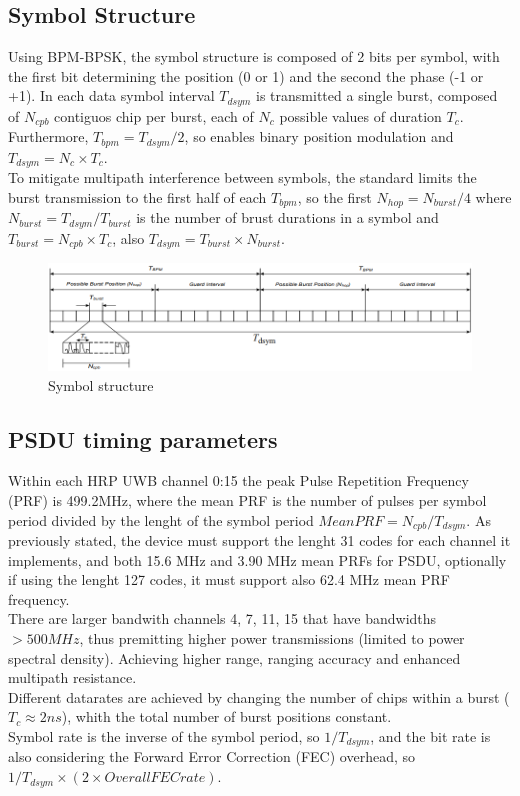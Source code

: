 \documentclass[conference]{IEEEtran}
\begin{document}
\subsection{Symbol Structure}
Using BPM-BPSK, the symbol structure is composed of 2 bits per symbol, with the first bit
determining the position (0 or 1) and the second the phase (-1 or +1). In each data symbol
interval $T_{dsym}$ is transmitted a single burst, composed of $N_{cpb}$ contiguos chip per 
burst, each of $N_{c}$ possible values of duration $T_{c}$. Furthermore, $T_{bpm}=T_{dsym}/2$, 
so enables binary position modulation and $T_{dsym}=N_{c} \times T_{c}$.\\
To mitigate multipath interference between symbols, the standard\cite{10794632} limits the burst transmission 
to the first half of each $T_{bpm}$, so the first $N_{hop}=N_{burst}/4$ where 
$N_{burst}=T_{dsym}/T_{burst}$ is the number of brust durations in a symbol and 
$T_{burst}=N_{cpb} \times T_{c}$, also $T_{dsym}=T_{burst} \times N_{burst}$.\\

\begin{figure}[!h]
  \centering
  \includegraphics[width=\linewidth]{symbol-structure}
  \caption{Symbol structure}
  \label{fig:symbol-structure}
\end{figure}

\subsection{PSDU timing parameters}
Within each HRP UWB channel {0:15} the peak Pulse Repetition Frequency (PRF) is 499.2MHz,
where the mean PRF is the number of pulses per symbol period divided by the lenght of the
symbol period $Mean PRF = N_{cpb}/T_{dsym}$.
As previously stated, the device must support the lenght 31 codes for each channel it
implements, and both 15.6 MHz and 3.90 MHz mean PRFs for PSDU, optionally if using the
lenght 127 codes, it must support also 62.4 MHz mean PRF frequency.\\
There are larger bandwith channels {4, 7, 11, 15} that
have bandwidths $>500MHz$, thus premitting higher power
transmissions (limited to power spectral density). Achieving higher range, ranging accuracy 
and enhanced multipath resistance.\\
Different datarates are achieved by changing the number of chips within a burst 
($T_{c}\approx2ns$), whith the total number of burst positions constant.\\
Symbol rate is the inverse of the symbol period, so $1/T_{dsym}$, and the bit rate is also
considering the Forward Error Correction (FEC) overhead, so 
$1/T_{dsym}\times(2 \times Overall FEC rate)$.\\
\end{document}
